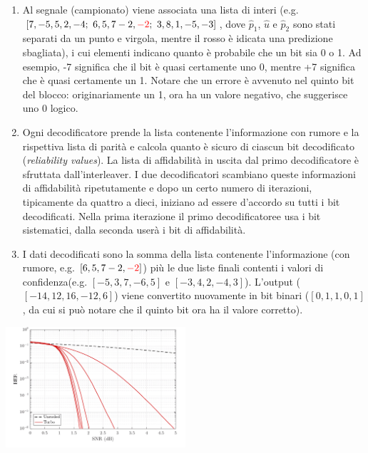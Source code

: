 \begin{enumerate}
    \item Al segnale (campionato) viene associata una lista di interi (e.g. $[7, -5, 5, 2, -4; \ 6, 5, 7 -2, \textcolor{red}{-2}; \ 3, 8, 1, -5, -3]$, dove $\hat{p}_1$, $\hat{u}$ e $\hat{p}_2$ sono stati separati da un punto e virgola, mentre il rosso è idicata una predizione sbagliata), 
    i cui elementi indicano quanto è probabile che un bit sia 0 o 1. Ad esempio, -7 significa che il bit è quasi certamente uno 0, mentre +7 significa che è quasi certamente un 1. Notare che un errore è avvenuto nel quinto bit del blocco: originariamente un 1, ora ha un valore negativo, che suggerisce uno 0 logico.
    \item Ogni decodificatore prende la lista contenente l'informazione con rumore e la rispettiva lista di parità e calcola quanto è sicuro di ciascun bit decodificato (\textit{reliability values}). La lista di affidabilità in uscita dal primo decodificatore è sfruttata dall'interleaver. I due decodificatori scambiano queste informazioni di affidabilità ripetutamente e dopo un certo numero di iterazioni, tipicamente da quattro a dieci, iniziano ad essere d'accordo su tutti i bit decodificati. Nella prima iterazione il primo decodificatoree usa i bit sistematici, dalla seconda userà i bit di affidabilità.
    \item I dati decodificati sono la somma della lista contenente l'informazione (con rumore, e.g. $[6, 5, 7 -2, \textcolor{red}{-2}]$) più le due liste finali contenti i valori di confidenza(e.g. $[-5, 3, 7, -6, 5]$ e $[-3, 4, 2, -4, 3]$). L'output ($[-14, 12, 16, -12, 6]$) viene convertito nuovamente in bit binari ($[0, 1, 1, 0, 1]$,  da cui si può notare che il quinto bit ora ha il valore corretto).
\end{enumerate}



\begin{center}
    
\includegraphics[width=0.5\textwidth]{imgs/turbo_code_ber.png}
\end{center}

